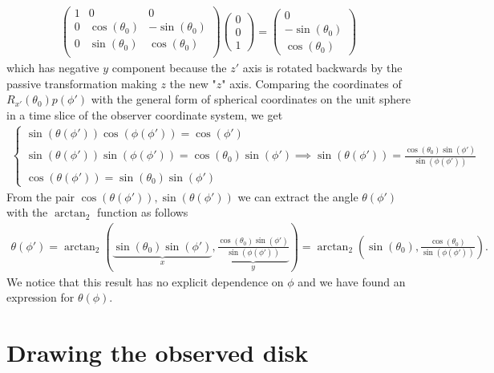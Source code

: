 \documentclass[10pt, a4paper]{article}
\begin{document}
\begin{align*}
  \begin{pmatrix}
    1 & 0 & 0\\
    0 & \cos(\theta_0) & -\sin(\theta_0)\\
    0 & \sin(\theta_0) & \cos(\theta_0)\\
  \end{pmatrix}
  \begin{pmatrix}
    0\\
    0\\
    1
  \end{pmatrix}
  =
  \begin{pmatrix}
    0\\
    -\sin(\theta_0)\\
     \cos(\theta_0)
  \end{pmatrix}
\end{align*}
which has negative $y$ component because the $z'$ axis is rotated backwards by the passive transformation making $z$ the new "$z$" axis. Comparing the coordinates of $R_{x'}(\theta_0) p(\phi')$ with the general form of spherical coordinates on the unit sphere in a time slice of the observer coordinate system, we get
\begin{align*}
  \begin{cases}
    \sin(\theta(\phi'))\cos(\phi(\phi')) = \cos(\phi')\\
    \sin(\theta(\phi'))\sin(\phi(\phi')) = \cos(\theta_0)\sin(\phi') \implies \sin(\theta(\phi')) = \frac{\cos(\theta_0)\sin(\phi')}{\sin(\phi(\phi'))} \\
    \cos(\theta(\phi')) = \sin(\theta_0)\sin(\phi')
  \end{cases}
\end{align*}
From the pair $\cos(\theta(\phi')), \sin(\theta(\phi'))$ we can extract the angle $\theta(\phi')$ with the $\arctan_2$ function as follows
\begin{align*}
  \theta(\phi') = \arctan_2\left(\underbrace{\sin(\theta_0)\sin(\phi')}_{x}, \underbrace{\frac{\cos(\theta_0)\sin(\phi')}{\sin(\phi(\phi'))}}_y\right) = \arctan_2\left(\sin(\theta_0), \frac{\cos(\theta_0)}{\sin(\phi(\phi'))}\right).
\end{align*}
We notice that this result has no explicit dependence on $\phi$ and we have found an expression for $\theta(\phi)$. 

\newpage

\section{Drawing the observed disk}
\end{document}
